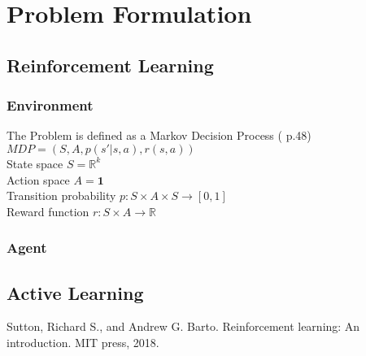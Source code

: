 \documentclass[11pt]{article}
\begin{document}
\section{Problem Formulation}
    \subsection{Reinforcement Learning}
        \subsubsection{Environment}
            The Problem is defined as a Markov Decision Process (\cite{sutton18} p.48) \\
            $MDP = (S, A, p(s' | s, a), r(s, a))$ \\[1mm]
            State space $S = \mathbb{R}^k$ \\[1mm]
            Action space $A = \textbf{1}$ \\[1mm]
            Transition probability $p: S \times A \times S \rightarrow [0,1]$ \\[1mm]
            Reward function $r: S \times A \rightarrow \mathbb{R}$
        \subsubsection{Agent}


    \subsection{Active Learning}

    \begin{thebibliography}{9}
         Sutton, Richard S., and Andrew G. Barto. Reinforcement learning: An introduction. MIT press, 2018.
    \end{thebibliography}
\end{document}
